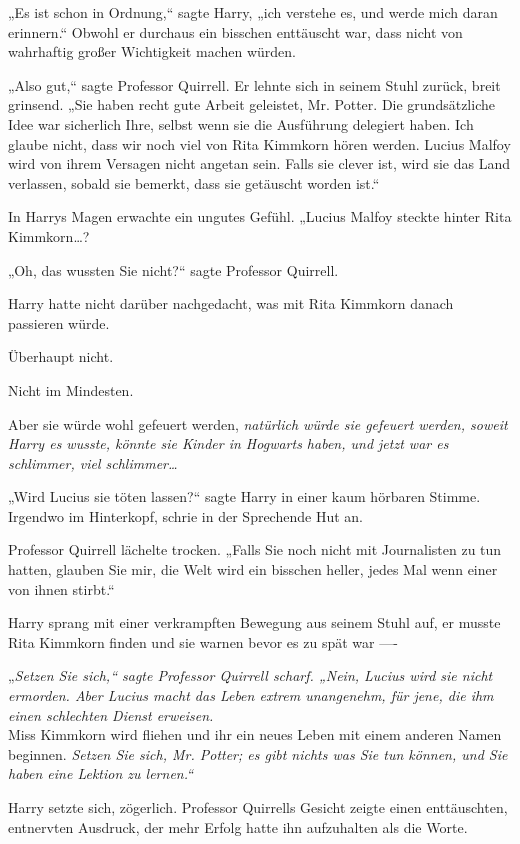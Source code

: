 {„Es ist schon in Ordnung,“ sagte Harry, „ich verstehe es, und werde mich daran erinnern.“ Obwohl er durchaus ein bisschen enttäuscht war, dass nicht von wahrhaftig großer Wichtigkeit machen würden.

„Also gut,“ sagte Professor Quirrell. Er lehnte sich in seinem Stuhl zurück, breit grinsend. „Sie haben recht gute Arbeit geleistet, Mr. Potter. Die grundsätzliche Idee war sicherlich Ihre, selbst wenn sie die Ausführung delegiert haben. Ich glaube nicht, dass wir noch viel von Rita Kimmkorn hören werden. Lucius Malfoy wird von ihrem Versagen nicht angetan sein. Falls sie clever ist, wird sie das Land verlassen, sobald sie bemerkt, dass sie getäuscht worden ist.“

In Harrys Magen erwachte ein ungutes Gefühl. „Lucius Malfoy steckte hinter Rita Kimmkorn…?

„Oh, das wussten Sie nicht?“ sagte Professor Quirrell.

Harry hatte nicht darüber nachgedacht, was mit Rita Kimmkorn danach passieren würde.

Überhaupt nicht.

Nicht im Mindesten.

Aber sie würde wohl gefeuert werden, \emph{natürlich würde sie gefeuert werden, soweit Harry es wusste, könnte sie Kinder in Hogwarts haben, und jetzt war es schlimmer, viel schlimmer…}

„Wird Lucius sie töten lassen?“ sagte Harry in einer kaum hörbaren Stimme. Irgendwo im Hinterkopf, schrie in der Sprechende Hut an.

Professor Quirrell lächelte trocken. „Falls Sie noch nicht mit Journalisten zu tun hatten, glauben Sie mir, die Welt wird ein bisschen heller, jedes Mal wenn einer von ihnen stirbt.“

Harry sprang mit einer verkrampften Bewegung aus seinem Stuhl auf, er musste Rita Kimmkorn finden und sie warnen bevor es zu spät war ----

„\emph{Setzen Sie sich,“ sagte Professor Quirrell scharf. „Nein, Lucius wird sie nicht ermorden. Aber Lucius macht das Leben \emph{extrem} unangenehm, für jene, die ihm einen schlechten Dienst erweisen.}\\ Miss Kimmkorn wird fliehen und ihr ein neues Leben mit einem anderen Namen beginnen. \emph{Setzen Sie sich, Mr. Potter; es gibt nichts was Sie tun können, und Sie haben eine Lektion zu lernen.“}

Harry setzte sich, zögerlich. Professor Quirrells Gesicht zeigte einen enttäuschten, entnervten Ausdruck, der mehr Erfolg hatte ihn aufzuhalten als die Worte.

}
